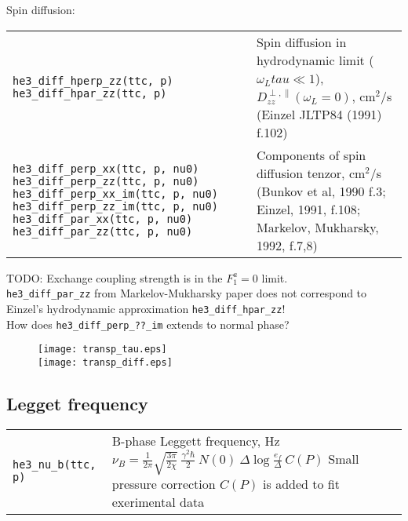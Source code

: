 \documentclass[a4paper]{article}
\begin{document}
Spin diffusion:

\medskip
\noindent\begin{tabular}{p{6cm}p{10cm}}
\tt he3\_diff\_hperp\_zz(ttc, p)\newline
\tt he3\_diff\_hpar\_zz(ttc, p)
& Spin diffusion in hydrodynamic limit ($\omega_L tau \ll 1$),
  $D^{\perp,\parallel}_{zz}(\omega_L=0)$, cm$^2$/s\newline
  {(\small Einzel JLTP84 (1991) f.102)}\\

\tt he3\_diff\_perp\_xx(ttc, p, nu0)\newline
\tt he3\_diff\_perp\_zz(ttc, p, nu0)\newline
\tt he3\_diff\_perp\_xx\_im(ttc, p, nu0)\newline
\tt he3\_diff\_perp\_zz\_im(ttc, p, nu0)\newline
\tt he3\_diff\_par\_xx(ttc, p, nu0)\newline
\tt he3\_diff\_par\_zz(ttc, p, nu0)\newline
&Components of spin diffusion tenzor, cm$^2$/s\newline
{\small(Bunkov et al, 1990 f.3; Einzel, 1991, f.108;\newline
Markelov, Mukharsky, 1992, f.7,8)}\\
\end{tabular}
\medskip

\noindent TODO: Exchange coupling strength is in the $F_1^a = 0$ limit.\\
{\tt he3\_diff\_par\_zz} from Markelov-Mukharsky paper does not correspond
to Einzel's hydrodynamic approximation {\tt he3\_diff\_hpar\_zz}!\\
How does {\tt he3\_diff\_perp\_??\_im} extends to normal phase?

\begin{figure}[p]
\texttt{[image: transp\_tau.eps]}\\
\texttt{[image: transp\_diff.eps]}
\end{figure}

\eject
\subsection*{Legget frequency}

\medskip
\noindent\begin{tabular}{lp{11cm}}
\tt he3\_nu\_b(ttc, p)       &B-phase Leggett frequency, Hz\newline
                             $\displaystyle \nu_B =\frac{1}{2\pi}\sqrt{\frac{3\pi}{2\chi}}
                             \ \frac{\gamma^2\hbar}{2}\ N(0)\ \Delta \log\frac{e_f}{\Delta}
                             \ C(P)$\newline
                             Small pressure correction $C(P)$ is added to fit exerimental data\\
\end{tabular}
\medskip
\end{document}
